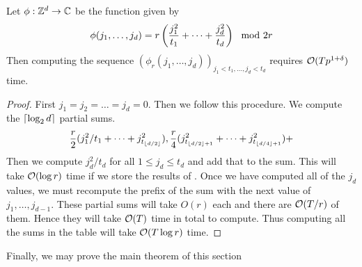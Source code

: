 \begin{lemma}\label{lem:compute-array}
    Let $\phi: {\mathbb Z}^d \to {\mathbb C}$ be the function given by
    \[
        \phi(j_1, \ldots, j_d) = r\left(\frac{j_1^2}{t_1} + \cdots + \frac{j_d^2}{t_d}\right) \mod 2r
    \]
    Then computing the sequence $(\phi_r(j_1, \ldots, j_d))_{j_1 < t_1, \ldots, j_d < t_d}$ requires $\mathcal O(Tp^{1 + \delta})$ time.
\end{lemma}

\begin{proof}
    First $j_1 = j_2 = \ldots = j_d = 0$. Then we follow this procedure. We compute the $\left \lceil \log_2 d \right \rceil$ partial sums. 
    \[
      \frac{r}{2}(j_1^2/t_1 + \cdots + j^2_{t_{\left \lfloor d/2 \right \rfloor}}), \frac{r}{4}(j_{t_{\left \lfloor d/2 \right \rfloor+1}}^2 + \cdots + j^2_{t_{\left \lfloor d/4 \right \rfloor+1}}) + 
    \]
    Then we compute $j_d^2/t_d$ for all $1 \le j_d \le t_d$ and add that to the sum. This will take $\mathcal O(\log r)$ time if we store the results of . Once we have computed all of the $j_d$ values, we must recompute the prefix of the sum with the next value of $j_1, \ldots, j_{d-1}$. These partial sums will take $O(r)$ each and there are $\mathcal O(T/r)$ of them. Hence they will take $\mathcal O(T)$ time in total to compute. Thus computing all the sums in the table will take $\mathcal O(T \log r)$ time. 
\end{proof}


Finally, we may prove the main theorem of this section

